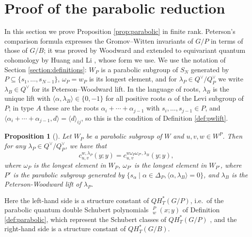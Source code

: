 \documentclass{amsart}
\newtheorem{proposition}[lemma]{Proposition}
\theoremstyle{definition}
\theoremstyle{remark}
\numberwithin{equation}{section}
\DeclareMathOperator{\qsch}{\widetilde{\mathfrak{S}}}
\begin{document}
\section{Proof of the parabolic reduction} \label{section:pw}

In this section we prove Proposition \ref{prop:parabolic} in finite rank. Peterson's comparison formula expresses the Gromov--Witten invariants of $G/P$ in terms of those of $G/B$; it was proved by Woodward \cite{woodward2005d} and extended to equivariant quantum cohomology by Huang and Li \cite{huang2015equivariant}, whose form we use. We use the notation of Section \ref{section:definitions}: $W_P$ is a parabolic subgroup of $S_N$ generated by $P\subseteq\{s_1,\ldots,s_{N-1}\}$, $\omega_P=w_P$ is its longest element, and for $\lambda_P\in Q^\vee/Q^\vee_P$ we write $\lambda_B\in Q^\vee$ for its Peterson--Woodward lift. In the language of roots, $\lambda_B$ is the unique lift with $\langle\alpha,\lambda_B\rangle\in\{0,-1\}$ for all positive roots $\alpha$ of the Levi subgroup of $P$; in type $A$ these are the roots $\alpha_i+\cdots+\alpha_{j-1}$ with $s_i,\ldots,s_{j-1}\in P$, and $\langle\alpha_i+\cdots+\alpha_{j-1},d\rangle=\langle d\rangle_{ij}$, so this is the condition of Definition \ref{def:pwlift}.

\begin{proposition}[{\cite[Proposition~2.10]{huang2015equivariant}}] \label{prop:huangli}
Let $W_P$ be a parabolic subgroup of $W$ and $u,v,w\in W^P$. Then for any $\lambda_P\in Q^\vee/Q_P^\vee$, we have that
$$c_{u,v}^{w,\lambda_P}(y;y) = c_{u,v}^{w\omega_P\omega_{P'},\lambda_B}(y;y),$$
where $\omega_P$ is the longest element in $W_P$, $\omega_{P'}$ is the longest element in $W_{P'}$, where $P'$ is the parabolic subgroup generated by $\{s_\alpha\mid \alpha\in\Delta_P,\langle \alpha, \lambda_B\rangle=0\}$, and $\lambda_B$ is the Peterson-Woodward lift of $\lambda_P$.
\end{proposition}

Here the left-hand side is a structure constant of $QH_T^*(G/P)$, i.e.\ of the parabolic quantum double Schubert polynomials $\qsch^P_w(x;y)$ of Definition \ref{def:parabolic}, which represent the Schubert classes of $QH_T^*(G/P)$ \cite{lam2014quantum}, and the right-hand side is a structure constant of $QH_T^*(G/B)$.
\end{document}
